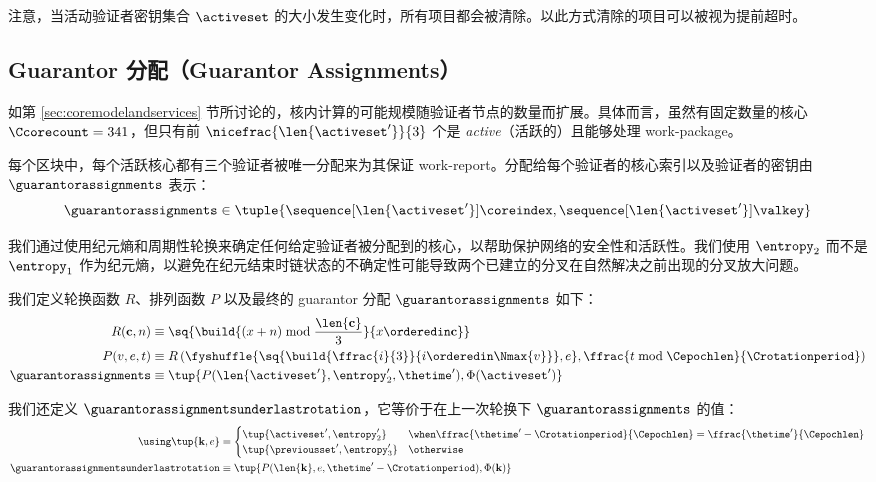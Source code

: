 注意，当活动验证者密钥集合 $\activeset$ 的大小发生变化时，所有项目都会被清除。以此方式清除的项目可以被视为提前超时。



\subsection{Guarantor 分配（Guarantor Assignments）}\label{sec:coresandvalidators}

如第 \ref{sec:coremodelandservices} 节所讨论的，核内计算的可能规模随验证者节点的数量而扩展。具体而言，虽然有固定数量的核心 $\Ccorecount = 341$，但只有前 $\nicefrac{\len{\activeset'}}{3}$ 个是 \emph{active}（活跃的）且能够处理 work-package。

每个区块中，每个活跃核心都有三个验证者被唯一分配来为其保证 work-report。分配给每个验证者的核心索引以及验证者的密钥由 $\guarantorassignments$ 表示：
\begin{equation}
  \guarantorassignments \in \tuple{\sequence[\len{\activeset'}]{\coreindex}, \sequence[\len{\activeset'}]{\valkey}}
\end{equation}

我们通过使用纪元熵和周期性轮换来确定任何给定验证者被分配到的核心，以帮助保护网络的安全性和活跃性。我们使用 $\entropy_2$ 而不是 $\entropy_1$ 作为纪元熵，以避免在纪元结束时链状态的不确定性可能导致两个已建立的分叉在自然解决之前出现的分叉放大问题。

我们定义轮换函数 $R$、排列函数 $P$ 以及最终的 guarantor 分配 $\guarantorassignments$ 如下：
\begin{align}
  R(\mathbf{c}, n) &\equiv \sq{\build{(x + n) \bmod \frac{\len{\mathbf{c}}}{3}}{x \orderedin \mathbf{c}}}\\
  P(v, e, t) &\equiv R\left(
    \fyshuffle{\sq{\build{\ffrac{i}{3}}{i \orderedin \Nmax{v}}}, e},
    \ffrac{t \bmod \Cepochlen}{\Crotationperiod}
  \right)\\
  \guarantorassignments &\equiv \tup{P(\len{\activeset'}, \entropy'_2, \thetime'), \Phi(\activeset')}
\end{align}

我们还定义 $\guarantorassignmentsunderlastrotation$，它等价于在上一次轮换下 $\guarantorassignments$ 的值：
\begin{equation}
  \label{eq:priorassignments}
  \begin{aligned}
    \using \tup{\mathbf{k}, e} &= \begin{cases}
      \tup{\activeset', \entropy'_2} &\when \displaystyle\ffrac{\thetime' - \Crotationperiod}{\Cepochlen} = \ffrac{\thetime'}{\Cepochlen}\\
      \tup{\previousset', \entropy'_3} &\otherwise
    \end{cases} \\
    \guarantorassignmentsunderlastrotation &\equiv \tup{
      P(\len{\mathbf{k}}, e, \thetime' - \Crotationperiod),
      \Phi(\mathbf{k})
    }
  \end{aligned}
\end{equation}




